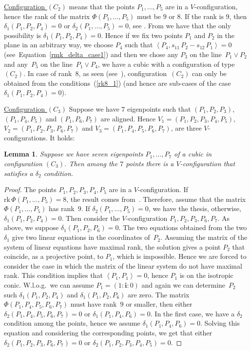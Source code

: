\documentclass{amsart}
\theoremstyle{plain}
\newtheorem{lemma}{Lemma}[section]
\theoremstyle{definition}
\newcommand{\scl}[2]{\left\langle {#1}, {#2} \right\rangle}
\newcommand{\iii}{\textbf{i}}
\newcommand{\rk}{\ensuremath{\mathrm{rk}}}
\begin{document}
\underline{Configuration $(C_2)$} means that the points
$P_1, \dots, P_5$ are in a
$V$-configuration, hence the rank of the matrix $\Phi(P_1, \dots, P_5)$
must be $9$ or $8$. If the rank is $9$, then $\delta_1(P_1, P_2, P_4) = 0$
or $\delta_2(P_1, \dots, P_5) = 0$, see .
From  we have that the only possibility
is $\delta_1(P_1, P_2, P_4) = 0$. Hence if we fix two points $P_1$ and $P_2$
in the plane in an arbitrary way, we choose $P_4$ such that
$\scl{P_4}{s_{11}\, P_2 - s_{12} \, P_1}=0$
(see~Equation~\eqref{rmk_delta_case1}) and then we chose any $P_3$
on the line~$P_1 \vee P_2$ and any~$P_5$ on the line~$P_1 \vee P_4$, we have a cubic
with a configuration of type~$(C_2)$. In case of rank~$8$, as seen
(see~),
configuration~$(C_2)$ can only be
obtained from the conditions~(\ref{rk8_1}) (and hence are sub-cases
of the case $\delta_1(P_1, P_2, P_4)=0$).

\underline{Configuration $(C_3)$} Suppose we have $7$ eigenpoints such that
$(P_1, P_2, P_3)$, $(P_1, P_4, P_5)$ and $(P_1, P_6, P_7)$ are
aligned. Hence
$V_1 = (P_1, P_2, P_3, P_4, P_5)$, $V_2 = (P_1, P_2, P_3, P_6, P_7)$ and
$V_3 = (P_1, P_4, P_5, P_6, P_7)$, are three $V$-configurations. It holds:

\begin{lemma}
\label{no_delta1_delta1} Suppose we have seven eigenpoints $P_1, \dots, P_7$
of a cubic in configuration $(C_3)$. Then among the $7$ points there is a
$V$-configuration that satisfies a $\delta_2$ condition.
\end{lemma}
\begin{proof}
The points $P_1, P_2, P_3, P_4, P_5$ are in a $V$-configuration. If
$\rk \, \Phi(P_1, \dots, P_5) = 8$, the result comes from~.
Therefore, assume that the matrix $\Phi(P_1, \dots, P_5)$ has
rank~$9$. If
$\delta_2(P_1, \dots, P_5) = 0$, we have the thesis, otherwise,
$\delta_1(P_1, P_2, P_4) = 0$. Then consider the $V$-configuration
$P_1, P_2, P_3, P_6, P_7$. As above, we suppose $\delta_1(P_1, P_2, P_6) = 0$.
The two equations obtained from the two $\delta_1$ give two
linear equations in the coordinates
of~$P_2$. Assuming the matrix of the system of linear equations have
maximal rank, the solution gives a point $P_2$ that coincide, as
a projective point, to $P_1$, which is impossible. Hence we are forced to
consider the
case in which the matrix of the linear system do not have maximal rank.
This condition implies that $\scl{P_1}{P_1} = 0$, hence $P_1$ is on the
isotropic conic. W.l.o.g.\ we can assume $P_1 = (1: \iii: 0)$ and again
we can determine~$P_2$ such $\delta_1(P_1, P_2, P_4)$ and
$\delta_1(P_1, P_2, P_6)$ are zero. The matrix $\Phi(P_1, P_4, P_5, P_6, P_7)$
must have rank~$9$ or smaller, then either
$\delta_2(P_1, P_4, P_5, P_6, P_7)=0$ or $\delta_1(P_1, P_4, P_6) = 0$. In
the first case, we have a $\delta_2$ condition among the points, hence
we assume $\delta_1(P_1, P_4, P_6) = 0$. Solving this equation and
considering the corresponding points, we get that either
$\delta_2(P_1, P_2, P_3, P_6, P_7) = 0$ or
$\delta_2(P_1, P_2, P_3, P_4, P_5) = 0$.
\end{proof}
\end{document}
